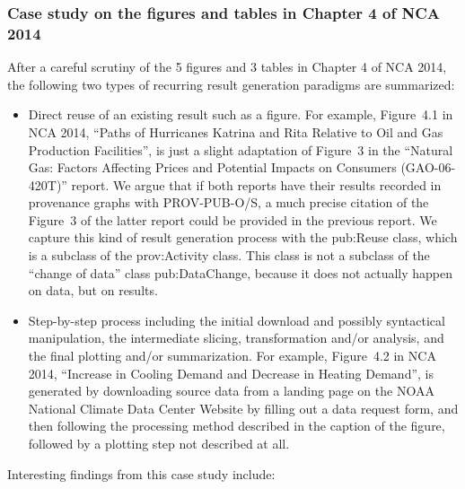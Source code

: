 \subsubsection{Case study on the figures and tables in Chapter 4 of NCA 2014}
After a careful scrutiny of the 5 figures and 3 tables in Chapter 4 of NCA 2014, the following two types of recurring result generation paradigms are summarized:
\begin{itemize}
	\item Direct reuse of an existing result such as a figure. For example, Figure~4.1 in NCA 2014, ``Paths of Hurricanes Katrina and Rita Relative to Oil and Gas Production Facilities'', is just a slight adaptation of Figure~3 in the ``Natural Gas: Factors Affecting Prices and Potential Impacts on Consumers (GAO-06-420T)'' report. We argue that if both reports have their results recorded in provenance graphs with PROV-PUB-O/S, a much precise citation of the Figure~3 of the latter report could be provided in the previous report. We capture this kind of result generation process with the pub:Reuse class, which is a subclass of the prov:Activity class. This class is not a subclass of the ``change of data'' class pub:DataChange, because it does not actually happen on data, but on results.
	\item Step-by-step process including the initial download and possibly syntactical manipulation, the intermediate slicing, transformation and/or analysis, and the final plotting and/or summarization. For example, Figure~4.2 in NCA 2014, ``Increase in Cooling Demand and Decrease in Heating Demand'', is generated by downloading source data from a landing page on the NOAA National Climate Data Center Website by filling out a data request form, and then following the processing method described in the caption of the figure, followed by a plotting step not described at all.
\end{itemize}
Interesting findings from this case study include:
